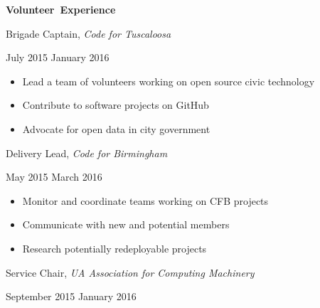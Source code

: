 \documentclass[11pt]{article}
\begin{document}
\vspace{0.8em}
\hbox{\large \textbf{Volunteer Experience}}

\begin{minipage}[t]{0.7\textwidth}
\flushleft
Brigade Captain, \textit{Code for Tuscaloosa}\\
\end{minipage}
\begin{minipage}[t]{0.25\textwidth}
\flushright
July 2015 \space \textemdash \space January 2016\\
\end{minipage}

\begin{itemize}
  \item Lead a team of volunteers working on open source civic technology
  \item Contribute to software projects on GitHub
  \item Advocate for open data in city government
\end{itemize}

\vspace{0.4em}
\begin{minipage}[t]{0.7\textwidth}
\flushleft
Delivery Lead, \textit{Code for Birmingham}\\
\end{minipage}
\begin{minipage}[t]{0.25\textwidth}
\flushright
May 2015 \space \textemdash \space March 2016\\
\end{minipage}

\begin{itemize}
  \item Monitor and coordinate teams working on CFB projects
  \item Communicate with new and potential members
  \item Research potentially redeployable projects
\end{itemize}

\vspace{0.4em}
\begin{minipage}[t]{0.65\textwidth}
\flushleft
Service Chair, \textit{UA Association for Computing Machinery}\\
\end{minipage}
\begin{minipage}[t]{0.3\textwidth}
\flushright
September 2015 \space \textemdash \space January 2016\\
\end{minipage}
\end{document}
